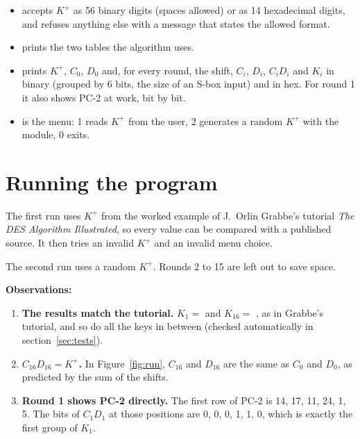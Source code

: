 \documentclass[11pt,a4paper]{article}
\begin{document}
\begin{itemize}
  \item {} accepts $K^+$ as 56 binary digits (spaces allowed) or as 14 hexadecimal
  digits, and refuses anything else with a message that states the allowed format.
  \item {} prints the two tables the algorithm uses.
  \item {} prints $K^+$, $C_0$, $D_0$ and, for every round, the shift, $C_i$,
  $D_i$, $C_iD_i$ and $K_i$ in binary (grouped by 6 bits, the size of an S-box input) and in hex.
  For round 1 it also shows PC-2 at work, bit by bit.
  \item {} is the menu: 1 reads $K^+$ from the user, 2 generates a random $K^+$ with the
   module, 0 exits.
\end{itemize}



\section{Running the program}

The first run uses $K^+$ from the worked example of J.~Orlin Grabbe's tutorial \textit{The DES
Algorithm Illustrated}, so every value can be compared with a published source. It then tries an
invalid $K^+$ and an invalid menu choice.



The second run uses a random $K^+$. Rounds 2 to 15 are left out to save space.



\textbf{Observations:}
\begin{enumerate}
  \item \textbf{The results match the tutorial.} $K_1 = $
   and $K_{16} = $
  , as in Grabbe's tutorial, and so
  do all the keys in between (checked automatically in section~\ref{sec:tests}).
  \item \textbf{$C_{16}D_{16} = K^+$.} In Figure~\ref{fig:run}, $C_{16}$ and $D_{16}$ are the same
  as $C_0$ and $D_0$, as predicted by the sum of the shifts.
  \item \textbf{Round 1 shows PC-2 directly.} The first row of PC-2 is 14, 17, 11, 24, 1, 5. The
  bits of $C_1D_1$ at those positions are 0, 0, 0, 1, 1, 0, which is exactly the first group
   of $K_1$.
\end{enumerate}
\end{document}

